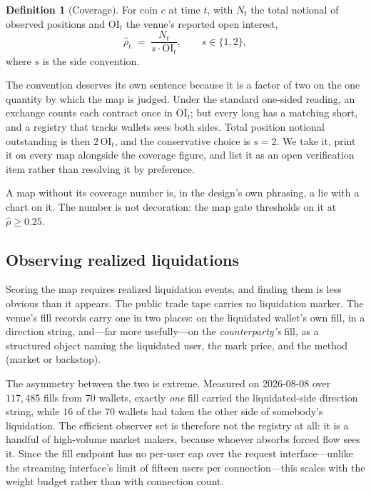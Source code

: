 \documentclass[11pt,a4paper]{article}
\theoremstyle{definition}
\newtheorem{definition}{Definition}[section]
\theoremstyle{plain}
\begin{document}
\begin{definition}[Coverage]
\label{def:coverage}
For coin $c$ at time $t$, with $N_t$ the total notional of observed positions and
$\mathrm{OI}_t$ the venue's reported open interest,
\begin{equation}
  \widehat{\rho}_t \;=\; \frac{N_t}{s \cdot \mathrm{OI}_t},
  \qquad s \in \{1, 2\},
  \label{eq:coverage}
\end{equation}
where $s$ is the side convention.
\end{definition}

The convention deserves its own sentence because it is a factor of two on the one quantity by which
the map is judged. Under the standard one-sided reading, an exchange counts each contract once in
$\mathrm{OI}_t$; but every long has a matching short, and a registry that tracks wallets sees both
sides. Total position notional outstanding is then $2\,\mathrm{OI}_t$, and the conservative choice is
$s=2$. We take it, print it on every map alongside the coverage figure, and list it as an open
verification item rather than resolving it by preference.

A map without its coverage number is, in the design's own phrasing, a lie with a chart on it. The
number is not decoration: the map gate thresholds on it at $\widehat{\rho} \ge 0.25$.

\subsection{Observing realized liquidations}

Scoring the map requires realized liquidation events, and finding them is less obvious than it
appears. The public trade tape carries no liquidation marker. The venue's fill records carry one in
two places: on the liquidated wallet's own fill, in a direction string, and---far more usefully---on
the \emph{counterparty's} fill, as a structured object naming the liquidated user, the mark price,
and the method (market or backstop).

The asymmetry between the two is extreme. Measured on 2026-08-08 over $117{,}485$ fills from $70$
wallets, exactly \emph{one} fill carried the liquidated-side direction string, while $16$ of the $70$
wallets had taken the other side of somebody's liquidation. The efficient observer set is therefore
not the registry at all: it is a handful of high-volume market makers, because whoever absorbs forced
flow sees it. Since the fill endpoint has no per-user cap over the request interface---unlike the
streaming interface's limit of fifteen users per connection---this scales with the weight budget
rather than with connection count.
\end{document}
